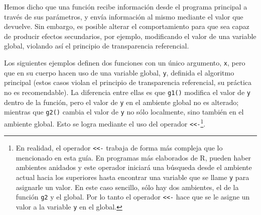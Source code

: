 \documentclass[
]{book}
\begin{document}
Hemos dicho que una función recibe información desde el programa principal a través de sus parámetros, y envía información al mismo mediante el valor que devuelve. Sin embargo, es posible alterar el comportamiento para que sea capaz de producir efectos secundarios, por ejemplo, modificando el valor de una variable global, violando así el principio de transparencia referencial.

Los siguientes ejemplos definen dos funciones con un único argumento, \texttt{x}, pero que en su cuerpo hacen uso de una variable global, \texttt{y}, definida el algoritmo principal (estos casos violan el principio de transparencia referencial, su práctica no es recomendable). La diferencia entre ellas es que \texttt{g1()} modifica el valor de \texttt{y} dentro de la función, pero el valor de \texttt{y} en el ambiente global no es alterado; mientras que \texttt{g2()} cambia el valor de \texttt{y} no sólo localmente, sino también en el ambiente global. Esto se logra mediante el uso del operador \texttt{\textless{}\textless{}-}\footnote{En realidad, el operador \texttt{\textless{}\textless{}-} trabaja de forma más compleja que lo mencionado en esta guía. En programas más elaborados de R, pueden haber ambientes anidados y este operador iniciará una búsqueda desde el ambiente actual hacia los superiores hasta encontrar una variable que se llame \texttt{y} para asignarle un valor. En este caso sencillo, sólo hay dos ambientes, el de la función \texttt{g2} y el global. Por lo tanto el operador \texttt{\textless{}\textless{}-} hace que se le asigne un valor a la variable \texttt{y} en el global.}.
\end{document}
